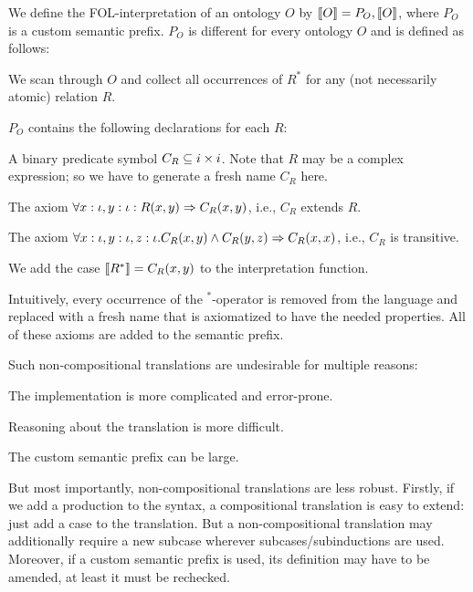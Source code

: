 \begin{example}
We define the FOL-interpretation of an ontology $O$ by $\llbracket O\rrbracket=P_O,\llbracket O\rrbracket$, where $P_O$ is a custom semantic prefix.
$P_O$ is different for every ontology $O$ and is defined as follows:

\begin{compactenum}
 \item We scan through $O$ and collect all occurrences of $R^*$ for any (not necessarily atomic) relation $R$.
 \item $P_O$ contains the following declarations for each $R$:
  \begin{compactitem}
  \item A binary predicate symbol $C_R\subseteq i\times i$. Note that $R$ may be a complex expression; so we have to generate a fresh name $C_R$ here.
  \item The axiom $\forall x:\iota,y:\iota:R(x,y)\Rightarrow C_R(x,y)$, i.e., $C_R$ extends $R$.
  \item The axiom $\forall x:\iota,y:\iota,z:\iota.C_R(x,y)\wedge C_R(y,z)\Rightarrow C_R(x,x)$, i.e., $C_R$ is transitive.
  \end{compactitem}
 \item We add the case $\llbracket R^*\rrbracket=C_R(x,y)$ to the interpretation function.
\end{compactenum}

Intuitively, every occurrence of the $^*$-operator is removed from the language and replaced with a fresh name that is axiomatized to have the needed properties.
All of these axioms are added to the semantic prefix.
\end{example}

Such non-compositional translations are undesirable for multiple reasons:
\begin{compactitem}
 \item The implementation is more complicated and error-prone.
 \item Reasoning about the translation is more difficult.
 \item The custom semantic prefix can be large.
\end{compactitem}

But most importantly, non-compositional translations are less robust.
Firstly, if we add a production to the syntax, a compositional translation is easy to extend: just add a case to the translation.
But a non-compositional translation may additionally require a new subcase wherever subcases/subinductions are used.
Moreover, if a custom semantic prefix is used, its definition may have to be amended, at least it must be rechecked.

